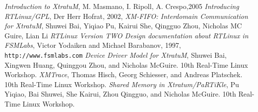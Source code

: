 
\begin{thebibliography}{widest-label}


 \emph{Introduction to XtratuM}, M. Masmano, I. Ripoll, A. Crespo,2005
 \emph{Introducing RTLinux/GPL}, Der Herr Hofrat, 2002,
  \emph{XM-FIFO: Interdomain Communication for XtratuM}, Shuwei Bai, Yiqiao Pu, Kairui She, Qingguo Zhou, Nicholas MC Guire, Lian Li
 \emph{RTLinux Version TWO Design documentation about RTLinux in FSMLabs}, Victor Yodaiken and Michael Barabanov, 1997, {\tt http://www.fsmlabs.com}
 \emph{Device Driver Model for XtratuM}, Shuwei Bai, Xingwen Huang, Quinggou Zhou, and Nicholas McGuire. 10th Real-Time Linux Workshop. 
 \emph{XMTrace}, Thomas Hisch, Georg Schiesser, and Andreas Platschek. 10th Real-Time Linux Workshop. 
	 \emph{Shared Memory in Xtratum/PaRTiKle}, Pu Yiqiao, Bai Shuwei, She Kairui, Zhou Qingguo, and Nicholas McGuire. 10th Real-Time Linux Workshop. 

     
\end{thebibliography}
     
